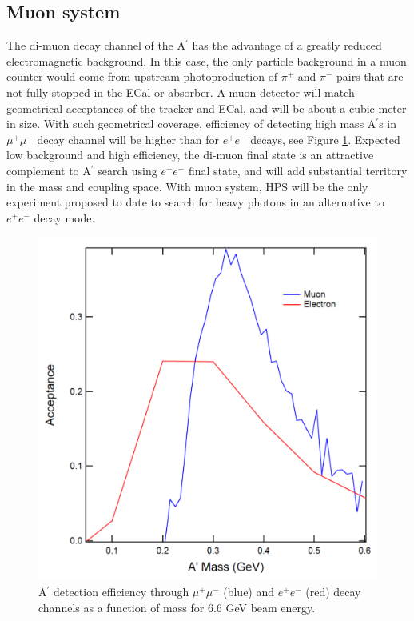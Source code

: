 \subsection{Muon system}

\label{sec:muon}


The di-muon decay channel of the A$^\prime$ has the advantage of a greatly reduced electromagnetic background.  In this case, the only particle background in a muon counter would come from upstream photoproduction of $\pi^+$ and $\pi^-$ pairs that are not fully stopped in the ECal or absorber.  A muon detector will match geometrical acceptances of the tracker and ECal, and will be about a cubic meter in size. With such geometrical coverage, efficiency of detecting high mass A$^\prime$s in $\mu^+\mu^-$ decay channel will be higher than for $e^+e^-$ decays, see Figure \ref{fig:muacc}. Expected low background and high efficiency, the di-muon final state is an attractive complement to A$^\prime$ search using $e^+e^-$ final state, and will add substantial territory in the mass and coupling space. With muon system, HPS will be the only experiment proposed to date to search for heavy photons in an alternative to $e^+e^-$ decay mode.

\begin{figure}[!ht]
\includegraphics[scale=0.4]{muon/acc.pdf}
\caption{\small{A$^\prime$ detection efficiency through $\mu^+\mu^-$ (blue) and $e^+e^-$ (red) decay channels as a function of mass for 6.6 GeV beam energy.}}\label{fig:muacc}
\end{figure}

